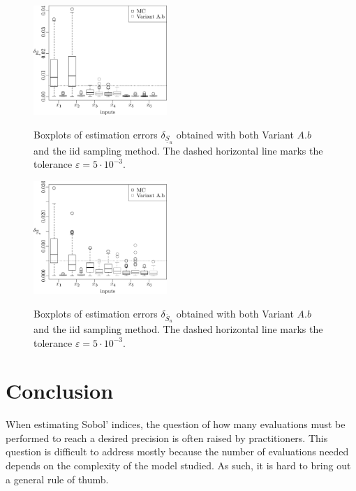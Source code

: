 \begin{figure}[t]
\caption{Boxplots of estimation errors $\delta_{\underline{S}_u}$ obtained with both Variant $A.b$ and the iid sampling method. The dashed horizontal line marks the tolerance $\varepsilon=5\cdot 10^{-3}$.}
\centering
\vspace*{0.2cm}
\includegraphics[width=0.45\textwidth]{Fig5.eps}
\label{compa_MC_first}
\end{figure}

\begin{figure}[t]
\caption{Boxplots of estimation errors $\delta_{\overline{S}_u}$ obtained with both Variant $A.b$ and the iid sampling method. The dashed horizontal line marks the tolerance $\varepsilon=5\cdot 10^{-3}$.}
\centering
\vspace*{0.2cm}
\includegraphics[width=0.45\textwidth]{Fig6.eps}
\label{compa_MC_tot}
\end{figure}


\section{Conclusion}
When estimating Sobol' indices, the question of how many evaluations must be performed to reach a desired precision is often raised by practitioners. This question is difficult to address mostly because the number of evaluations needed depends on the complexity of the model studied. As such, it is hard to bring out a general rule of thumb. 

